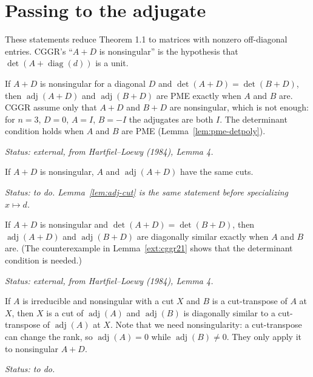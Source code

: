 \section{Passing to the adjugate}

These statements reduce Theorem 1.1 to matrices with nonzero off-diagonal entries.
CGGR's ``$A+D$ is nonsingular'' is the hypothesis that $\det(A+\operatorname{diag}(d))$ is
a unit.

\begin{lemma}
\label{ext:cggr21}
\leanok
{}
If $A+D$ is nonsingular for a diagonal $D$ and $\det(A+D)=\det(B+D)$, then
$\operatorname{adj}(A+D)$ and $\operatorname{adj}(B+D)$ are PME exactly when $A$ and $B$ are.
CGGR assume only that $A+D$ and $B+D$ are nonsingular, which is not enough: for $n=3$, $D=0$,
$A=I$, $B=-I$ the adjugates are both $I$. The determinant condition holds when $A$ and $B$ are
PME (Lemma~\ref{lem:pme-detpoly}).
\end{lemma}
\noindent\emph{Status: external, from Hartfiel--Loewy (1984), Lemma 4.}

\begin{lemma}
\label{lem:cggr26}
\leanok
{}
If $A+D$ is nonsingular, $A$ and $\operatorname{adj}(A+D)$ have the same cuts.
\end{lemma}
\noindent\emph{Status: to do. Lemma~\ref{lem:adj-cut} is the same statement before
specializing $x\mapsto d$.}

\begin{lemma}
\label{ext:cggr29}
\leanok
{}
If $A+D$ is nonsingular and $\det(A+D)=\det(B+D)$, then $\operatorname{adj}(A+D)$ and
$\operatorname{adj}(B+D)$ are diagonally similar exactly when $A$ and $B$ are. (The
counterexample in Lemma~\ref{ext:cggr21} shows that the determinant condition is needed.)
\end{lemma}
\noindent\emph{Status: external, from Hartfiel--Loewy (1984), Lemma 4.}

\begin{lemma}
\label{lem:cggr213}
\leanok
{}
If $A$ is irreducible and nonsingular with a cut $X$ and $B$ is a cut-transpose of $A$ at
$X$, then $X$ is
a cut of $\operatorname{adj}(A)$ and $\operatorname{adj}(B)$ is diagonally similar to a
cut-transpose of $\operatorname{adj}(A)$ at $X$.
Note that we need nonsingularity: a cut-transpose can change the
rank, so $\operatorname{adj}(A)=0$ while $\operatorname{adj}(B)\neq0$. They only apply it to
nonsingular $A+D$.
\end{lemma}
\noindent\emph{Status: to do.}

